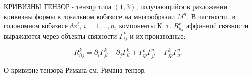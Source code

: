 \documentclass[10pt]{article}
\begin{document}
КРИВИЗНЫ ТЕНЗОР - тензор типа $(1,3)$, получающийся в разложении кривизны формы в локальном кобазисе на многообразии $M^{n}$. В частности, в голономном кобазисе $d x^{i}$, $i=1, \ldots, n$, компоненты К. т. $R_{l i j}^{k}$ аффинной связности выражаются через объекты связности $\Gamma_{i j}^{k}$ и их производные:



\[

R_{l i j}^{k}=\partial_{i} \Gamma_{j l}^{k}-\partial_{j} \Gamma_{i l}^{k}+\Gamma_{i p}^{k} \Gamma_{j l}^{p}-\Gamma_{j p}^{k} \Gamma_{l l}^{p} .

\]



О кривизне тензора Римана см. Римана тензор.
\end{document}
